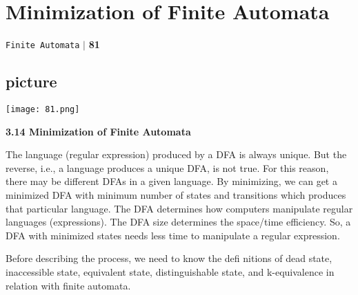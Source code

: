 \documentclass[a4,9pt]{beamer}
\begin{document}
\begin{frame}
\section*{Minimization of Finite Automata}
\begin{flushright}
 \texttt{Finite Automata} \hspace*{0.1cm}\textbf{$|$} \hspace*{0.1cm} \textbf{81}\hspace*{0.1cm}
\end{flushright}
\vspace*{1cm}

\begin{center}
\section{picture}
\texttt{[image: 81.png]}
\end{center}
\end{frame}

\begin{frame}
\LARGE{\textbf{3.14 Minimization of Finite Automata}}

\vspace*{0.2cm}
\small{The language (regular expression) produced by a DFA is always unique. But the reverse, i.e., a language
produces a unique DFA, is not true. For this reason, there may be different DFAs in a given language.
By minimizing, we can get a minimized DFA with minimum number of states and transitions which
produces that particular language. The DFA determines how computers manipulate regular languages
(expressions). The DFA size determines the space/time efficiency. So, a DFA with minimized states
needs less time to manipulate a regular expression.

\pause
\hspace*{0.2cm} Before describing the process, we need to know the defi nitions of dead state, inaccessible state,
equivalent state, distinguishable state, and k-equivalence in relation with finite automata.}
\end{frame}
\end{document}
